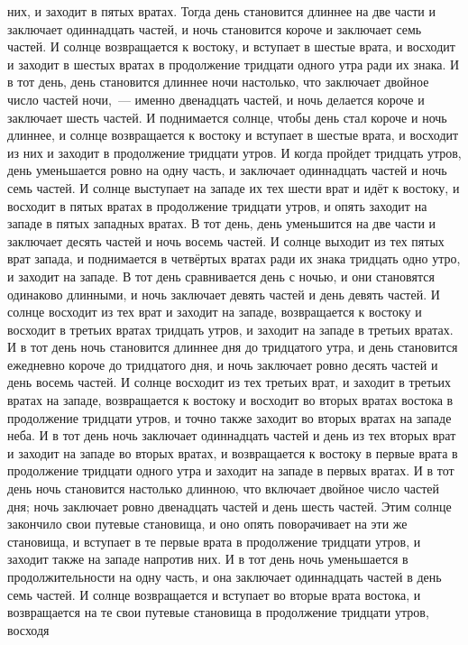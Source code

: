 них, и заходит в пятых вратах.
Тогда день становится длиннее на две части и заключает одиннадцать
частей, и ночь становится короче и заключает семь частей.
И солнце возвращается к востоку, и вступает в шестые врата, и восходит
и заходит в шестых вратах в продолжение тридцати одного утра ради их знака.
И в тот день, день становится длиннее ночи настолько, что заключает
двойное число частей ночи,~--- именно двенадцать частей, и ночь делается короче и
заключает шесть частей.
И поднимается солнце, чтобы день стал короче и ночь длиннее, и солнце
возвращается к востоку и вступает в шестые врата, и восходит из них и заходит в
продолжение тридцати утров.
И когда пройдет тридцать утров, день уменьшается ровно на одну часть,
и заключает одиннадцать частей и ночь семь частей.
И солнце выступает на западе их тех шести врат и идёт к востоку, и
восходит в пятых вратах в продолжение тридцати утров, и опять заходит на западе
в пятых западных вратах.
В тот день, день уменьшится на две части и заключает десять частей и
ночь восемь частей.
И солнце выходит из тех пятых врат запада, и поднимается в четвёртых
вратах ради их знака тридцать одно утро, и заходит на западе.
В тот день сравнивается день с ночью, и они становятся одинаково
длинными, и ночь заключает девять частей и день девять частей.
И солнце восходит из тех врат и заходит на западе, возвращается к
востоку и восходит в третьих вратах тридцать утров, и заходит на западе в
третьих вратах.
И в тот день ночь становится длиннее дня до тридцатого утра, и день
становится ежедневно короче до тридцатого дня, и ночь заключает ровно десять
частей и день восемь частей.
И солнце восходит из тех третьих врат, и заходит в третьих вратах на
западе, возвращается к востоку и восходит во вторых вратах востока в
продолжение тридцати утров, и точно также заходит во вторых вратах на западе
неба.
И в тот день ночь заключает одиннадцать частей и день из тех вторых
врат и заходит на западе во вторых вратах, и возвращается к востоку в первые
врата в продолжение тридцати одного утра и заходит на западе в первых вратах.
И в тот день ночь становится настолько длинною, что включает двойное
число частей дня; ночь заключает ровно двенадцать частей и день шесть частей.
Этим солнце закончило свои путевые становища, и оно опять поворачивает
на эти же становища, и вступает в те первые врата в продолжение тридцати утров,
и заходит также на западе напротив них.
И в тот день ночь уменьшается в продолжительности на одну часть, и она
заключает одиннадцать частей в день семь частей.
И солнце возвращается и вступает во вторые врата востока, и
возвращается на те свои путевые становища в продолжение тридцати утров, восходя
